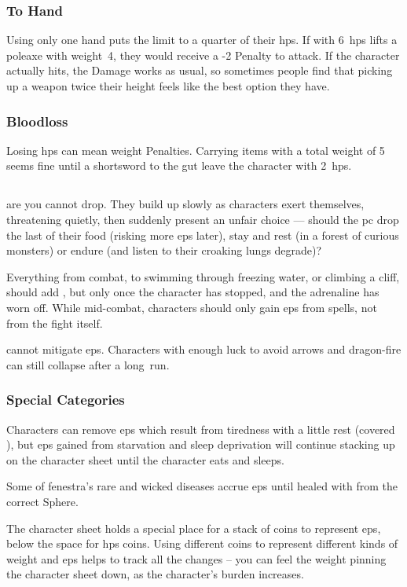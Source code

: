 \begin{multicols}{2}
\subsubsection{To Hand}
Using only one hand puts the limit to a quarter of their \glspl{hp}.
If  with 6~\glspl{hp} lifts a poleaxe with \gls{weight}~4, they would receive a -2 Penalty to attack.
If the character actually hits, the Damage works as usual, so sometimes people find that picking up a weapon twice their height feels like the best option they have.

\subsubsection{Bloodloss}

Losing \glspl{hp} can mean \Gls{weight} Penalties.
Carrying items with a total \gls{weight} of 5 seems fine until a shortsword to the gut leave the character with 2~\glspl{hp}.

\subsection{}
\label{ep}

 are  you cannot drop.
They build up slowly as characters exert themselves, threatening quietly, then suddenly present an unfair choice --- should the \gls{pc} drop the last of their food (risking more \glspl{ep} later), stay and rest (in a forest of curious monsters) or endure (and listen to their croaking lungs degrade)?

Everything from combat, to swimming through freezing water, or climbing a cliff, should add , but only once the character has stopped, and the adrenaline has worn off.
While mid-combat, characters should only gain \glspl{ep} from spells, not from the fight itself.

 cannot mitigate \glspl{ep}.
Characters with enough luck to avoid arrows and dragon-fire can still collapse after a long~run.

\subsubsection{Special Categories}

Characters can remove \glspl{ep} which result from tiredness with a little rest (covered ), but \glspl{ep} gained from starvation and sleep deprivation will continue stacking up on the character sheet until the character eats and sleeps.

Some of \gls{fenestra}'s rare and wicked diseases accrue \glspl{ep} until healed with  from the correct Sphere.

The character sheet holds a special place for a stack of coins to represent \glspl{ep}, below the space for \glspl{hp} coins.
Using different coins to represent different kinds of \gls{weight} and \glspl{ep} helps to track all the changes -- you can feel the weight pinning the character sheet down, as the character's burden increases.

\end{multicols}


